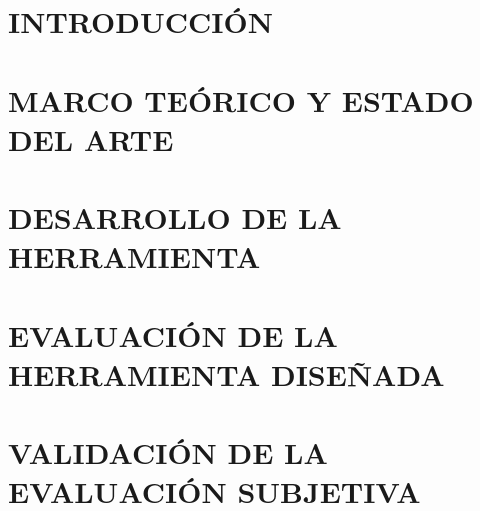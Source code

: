 \documentclass[12pt]{article}
\begin{document}

\newpage
\thispagestyle{plain} 




\clearpage %
\section{INTRODUCCIÓN} 



\clearpage



\newpage
\section{MARCO TEÓRICO Y ESTADO DEL ARTE} 
    

%     

\newpage
\section{DESARROLLO DE LA HERRAMIENTA} 
    

\newpage
\section{EVALUACIÓN DE LA HERRAMIENTA DISEÑADA} 
    

\newpage
\section{VALIDACIÓN DE LA EVALUACIÓN SUBJETIVA} 
    
\end{document}
